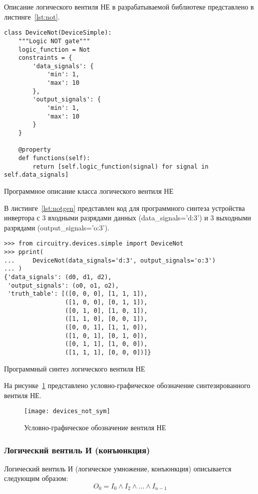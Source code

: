 \documentclass[document.tex]{subfiles}
\begin{document}
Описание логического вентиля НЕ в разрабатываемой библиотеке представлено в
листинге~\ref{lst:not}.

\begin{listing}[ht]
\begin{verbatim}
class DeviceNot(DeviceSimple):
    """Logic NOT gate"""
    logic_function = Not
    constraints = {
        'data_signals': {
            'min': 1,
            'max': 10
        },
        'output_signals': {
            'min': 1,
            'max': 10
        }
    }

    @property
    def functions(self):
        return [self.logic_function(signal) for signal in self.data_signals]
\end{verbatim}
\caption{Программное описание класса логического вентиля НЕ}
\label{lst:not}
\end{listing}

\clearpage
В листинге~\ref{lst:notgen} представлен код для программного синтеза
устройства инвертора с 3 входными разрядами данных (data\_signals='d:3') и 3
выходными разрядами (output\_signals='o:3').

\begin{listing}[ht]
\begin{verbatim}
>>> from circuitry.devices.simple import DeviceNot
>>> pprint(  
...     DeviceNot(data_signals='d:3', output_signals='o:3')
... )
{'data_signals': (d0, d1, d2),
 'output_signals': (o0, o1, o2),
 'truth_table': [([0, 0, 0], [1, 1, 1]),
                 ([1, 0, 0], [0, 1, 1]),
                 ([0, 1, 0], [1, 0, 1]),
                 ([1, 1, 0], [0, 0, 1]),
                 ([0, 0, 1], [1, 1, 0]),
                 ([1, 0, 1], [0, 1, 0]),
                 ([0, 1, 1], [1, 0, 0]),
                 ([1, 1, 1], [0, 0, 0])]}
\end{verbatim}
\caption{Программный синтез логического вентиля НЕ}
\label{lst:notgen}
\end{listing}

На рисунке~\ref{fig:devicenot} представлено условно-графическое обозначение
синтезированного вентиля НЕ.

\begin{figure}[here]
\centering
\texttt{[image: devices\_not\_sym]}
\caption{Условно-графическое обозначение вентиля НЕ}
\label{fig:devicenot}
\end{figure}

\clearpage
\subsubsection{Логический вентиль И (конъюнкция)}
Логический вентиль И (логическое умножение, конъюнкция) описывается следующим
образом:
\begin{equation}
\label{eq:and}
O_0 = I_0 \wedge I_2 \wedge \ldots \wedge I_{n - 1}
\end{equation}
\end{document}
